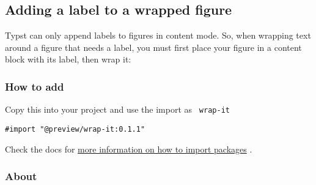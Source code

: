 
\subsection{Adding a label to a wrapped
figure}\label{adding-a-label-to-a-wrapped-figure}

Typst can only append labels to figures in content mode. So, when
wrapping text around a figure that needs a label, you must first place
your figure in a content block with its label, then wrap it:

\begin{Shaded}
\begin{Highlighting}[]
\NormalTok{\#let fig = [}
\NormalTok{]}
\end{Highlighting}
\end{Shaded}


\subsubsection{How to add}\label{how-to-add}

Copy this into your project and use the import as \texttt{\ wrap-it\ }

\begin{verbatim}
#import "@preview/wrap-it:0.1.1"
\end{verbatim}



Check the docs for
\href{https://typst.app/docs/reference/scripting/\#packages}{more
information on how to import packages} .

\subsubsection{About}\label{about}

